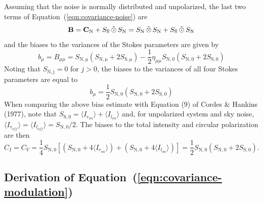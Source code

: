 \documentclass[twocolumn]{aastex6}
\newcommand{\Eqn}[1]{Equation~(\ref{eqn:#1})}
\newcommand{\irow}{\mu} \newcommand{\icol}{\nu}
\newcommand{\stimes}{\ensuremath{\tilde{\otimes}}}
\newcommand{\spinorBilinear}[2]{\ensuremath{{#1}\,\stimes\,{#2}}}
\newcommand{\outerSymm}[2]{\ensuremath{{#1}\,\tilde{\odot}\,{#2}}}
\begin{document}
{\begin{appendix}
\noindent
Assuming that the noise is normally distributed and unpolarized, the last
two terms of \Eqn{covariance-noise} are
\begin{equation}
{\bf B} = {\bf C}_\mathrm{N} + \outerSymm{S_\mathrm{S}}{S_\mathrm{N}} = \spinorBilinear{S_\mathrm{N}}{S_\mathrm{N}} + \outerSymm{S_\mathrm{S}}{S_\mathrm{N}}
\end{equation}
%
and the biases to the variances of the Stokes parameters are given by
%
\begin{equation}
  b_\irow = B_{\irow\irow} = S_\mathrm{N,\irow} \left( S_\mathrm{N,\irow} + 2 S_\mathrm{S,\irow} \right)
             - \frac{1}{2}\eta_{\irow\irow} S_\mathrm{N,0} \left( S_\mathrm{N,0} + 2 S_\mathrm{S,0} \right)
\end{equation}
%
Noting that $S_\mathrm{N,j}=0$ for $j>0$, the biases to the variances of all four
Stokes parameters are equal to
%
\[
b_\irow = \frac{1}{2} S_\mathrm{N,0} \left( S_\mathrm{N,0} + 2 S_\mathrm{S,0} \right)
\]
%
When comparing the above bias estimate with Equation (9) of Cordes \&
Hankins (1977), note that $S_\mathrm{S,0} = \langle I_{r_{on}} \rangle +
\langle I_{l_{on}} \rangle$ and, for unpolarized system and sky noise,
$\langle I_{r_{off}} \rangle = \langle I_{l_{off}} \rangle = S_\mathrm{N,0} /
2$.  The biases to the total intensity and circular polarization are
then
\[
C_I = C_V = \frac{1}{4} S_\mathrm{N,0}
\left[ \left( S_\mathrm{N,0} + 4 \langle I_{r_{on}} \rangle \right)
    +  \left( S_\mathrm{N,0} + 4 \langle I_{l_{on}} \rangle \right)
    \right]
    = \frac{1}{2} S_\mathrm{N,0} \left( S_\mathrm{N,0} + 2 S_\mathrm{S,0} \right).
\]

    
%
% 
%
\hrulefill
\subsection{Derivation of \Eqn{covariance-modulation}}


\end{appendix}}
\end{document}
